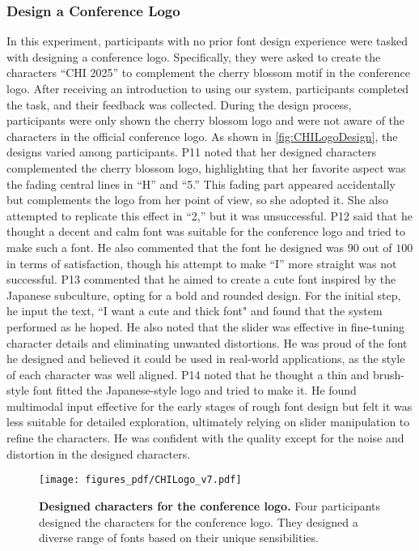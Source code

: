 \subsubsection{Design a Conference Logo}
In this experiment, participants with no prior font design experience were tasked with designing a conference logo.
Specifically, they were asked to create the characters ``CHI 2025'' to complement the cherry blossom motif in the conference logo.
After receiving an introduction to using our system, participants completed the task, and their feedback was collected.
During the design process, participants were only shown the cherry blossom logo and were not aware of the characters in the official conference logo.
As shown in \autoref{fig:CHILogoDesign}, the designs varied among participants.
P11 noted that her designed characters complemented the cherry blossom logo, highlighting that her favorite aspect was the fading central lines in ``H'' and ``5.''
This fading part appeared accidentally but complements the logo from her point of view, so she adopted it.
She also attempted to replicate this effect in ``2,'' but it was unsuccessful.
P12 said that he thought a decent and calm font was suitable for the conference logo and tried to make such a font.
He also commented that the font he designed was $90$ out of $100$ in terms of satisfaction, though his attempt to make ``I'' more straight was not successful.
P13 commented that he aimed to create a cute font inspired by the Japanese subculture, opting for a bold and rounded design.
For the initial step, he input the text, ``I want a cute and thick font" and found that the system performed as he hoped.
He also noted that the slider was effective in fine-tuning character details and eliminating unwanted distortions.
He was proud of the font he designed and believed it could be used in real-world applications, as the style of each character was well aligned.
P14 noted that he thought a thin and brush-style font fitted the Japanese-style logo and tried to make it.
He found multimodal input effective for the early stages of rough font design but felt it was less suitable for detailed exploration, ultimately relying on slider manipulation to refine the characters.
He was confident with the quality except for the noise and distortion in the designed characters.

\begin{figure}[ht]
    \centering
    \texttt{[image: figures\_pdf/CHILogo\_v7.pdf]}
    \caption{
    \textbf{Designed characters for the conference logo.}
    Four participants designed the characters for the conference logo.
    They designed a diverse range of fonts based on their unique sensibilities.
}
\label{fig:CHILogoDesign}
\end{figure}



